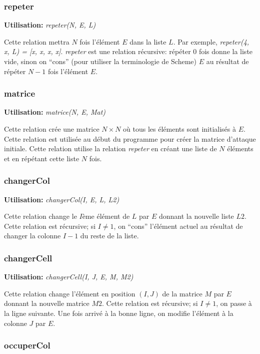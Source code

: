 \documentclass[10pt]{article}
\newcommand{\usage}[1]{\textbf{Utilisation: }\emph{#1}}
\begin{document}
\subsubsection{repeter}

\usage{repeter(N, E, L)}

Cette relation mettra $N$ fois l'élément $E$ dans la liste $L$. Par
exemple, \emph{repeter(4, x, L) = [x, x, x, x]}. \emph{repeter} est
une relation récursive: répéter 0 fois donne la liste vide, sinon on
``cons'' (pour utiliser la terminologie de Scheme) $E$ au résultat de
répéter $N-1$ fois l'élément $E$.

\subsubsection{matrice}

\usage{matrice(N, E, Mat)}

Cette relation crée une matrice $N \times N$ où tous les éléments sont
initialisés à $E$. Cette relation est utilisée au début du programme
pour créer la matrice d'attaque initiale. Cette relation utilise la
relation \emph{repeter} en créant une liste de $N$ éléments et en
répétant cette liste $N$ fois.

\subsubsection{changerCol}

\usage{changerCol(I, E, L, L2)}

Cette relation change le $I$ème élément de $L$ par $E$ donnant la
nouvelle liste $L2$. Cette relation est récursive; si $I \ne 1$, on
``cons'' l'élément actuel au résultat de changer la colonne $I-1$ du
reste de la liste.


\subsubsection{changerCell}

\usage{changerCell(I, J, E, M, M2)}

Cette relation change l'élément en position $(I, J)$ de la matrice $M$
par $E$ donnant la nouvelle matrice $M2$. Cette relation est
récursive; si $I \ne 1$, on passe à la ligne suivante. Une fois
arrivé à la bonne ligne, on modifie l'élément à la colonne $J$ par
$E$.


\subsubsection{occuperCol}
\end{document}
